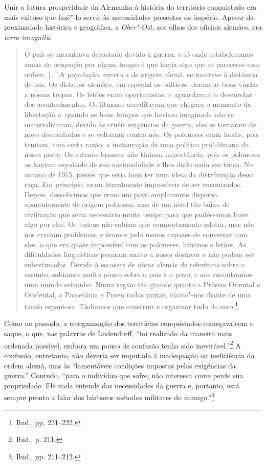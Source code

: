 Unir a futura prosperidade da Alemanha à história do território
conquistado era mais exitoso que fazê"-lo servir às necessidades
presentes do império. Apesar da proximidade histórica e geográfica, a
\textit{Ober"-Ost}, aos olhos dos oficiais alemães, era \textit{terra
incognita}:

\begin{quote}
O país se encontrava devastado devido à guerra, e só onde estabelecemos
zonas de ocupação por algum tempo é que havia algo que se parecesse com
ordem. [\ldots{}] A população, exceto a de origem alemã, se manteve à
distância de nós. Os distritos alemães, em especial os bálticos, deram
as boas vindas a nossas tropas. Os letões eram oportunistas, e
aguardavam o desenrolar dos acontecimentos. Os lituanos acreditavam que
chegara o momento da libertação e, quando os bons tempos que haviam
imaginado não se materializaram, devido às cruéis exigências da guerra,
eles se tornaram de novo desconfiados e se voltaram contra nós. Os
poloneses eram hostis, pois temiam, com certa razão, a instauração de
uma política pró"-lituana da nossa parte. Os rutenos brancos não tinham
importância, pois os poloneses os haviam espoliado de sua nacionalidade
e lhes dado nada em troca. No outono de 1915, pensei que seria bom ter
uma ideia da distribuição dessa raça. Em princípio, eram literalmente
impossíveis de ser encontrados. Depois, descobrimos que eram um povo
amplamente disperso, aparentemente de origem polonesa, mas de um nível
tão baixo de civilização que seria necessário muito tempo para que
pudéssemos fazer algo por eles. Os judeus não sabiam que comportamento
adotar, mas não nos criavam problemas, e éramos pelo menos capazes de
conversar com eles, o que era quase impossível com os poloneses,
lituanos e letões. As dificuldades linguísticas pesaram muito a nosso
desfavor e não podem ser subestimadas. Devido à escassez de obras alemãs
de referência sobre o assunto, sabíamos muito pouco sobre o país e o
povo, e nos encontramos num mundo estranho. Numa região tão grande
quanto a Prússia Oriental e Ocidental, a Pomerânia e Posen todas juntas,
víamo"-nos diante de uma tarefa espantosa. Tínhamos que construir e
organizar tudo do zero.\footnote{Ibid., pp. 221--222.}
\end{quote}

%

Como no passado, a reorganização dos territórios conquistados começava
com o saque, o que, nas palavras de Ludendorff, ``foi realizado da
maneira mais ordenada possível, embora um pouco de confusão tenha sido
inevitável.''\footnote{Ibid., p. 211.} A confusão, entretanto, não
deveria ser imputada à inadequação ou ineficiência da ordem alemã, mas
às ``lamentáveis condições impostas pelas exigências da guerra.''
Contudo, ``para o indivíduo que sofre, não interessa \textit{como} perde
sua propriedade. Ele nada entende das necessidades da guerra e,
portanto, está sempre pronto a falar dos bárbaros métodos militares do
inimigo.''\footnote{Ibid., pp. 211--212.}

